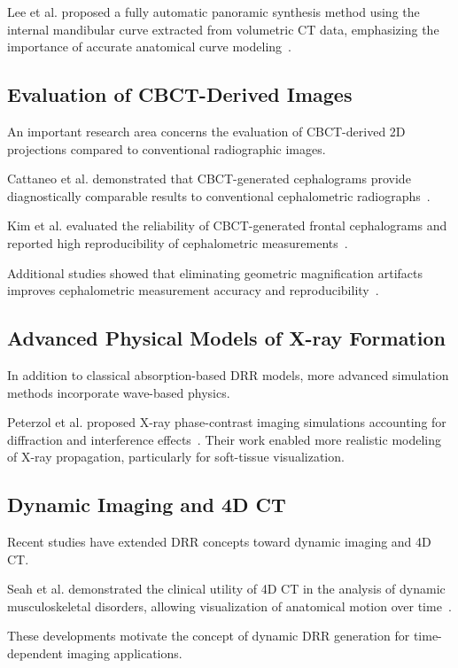 \documentclass[11pt,a4paper]{article}
\begin{document}
Lee et al. proposed a fully automatic panoramic synthesis method using the internal mandibular curve extracted from volumetric CT data, emphasizing the importance of accurate anatomical curve modeling~\cite{DBLP:conf/cimaging/LeeWLLS19}.

\subsection{Evaluation of CBCT-Derived Images}

An important research area concerns the evaluation of CBCT-derived 2D projections compared to conventional radiographic images.

Cattaneo et al. demonstrated that CBCT-generated cephalograms provide diagnostically comparable results to conventional cephalometric radiographs~\cite{Cattaneo2008}.

Kim et al. evaluated the reliability of CBCT-generated frontal cephalograms and reported high reproducibility of cephalometric measurements~\cite{Kim2012}.

Additional studies showed that eliminating geometric magnification artifacts improves cephalometric measurement accuracy and reproducibility~\cite{diagnostics11122292}.

\subsection{Advanced Physical Models of X-ray Formation}

In addition to classical absorption-based DRR models, more advanced simulation methods incorporate wave-based physics.

Peterzol et al. proposed X-ray phase-contrast imaging simulations accounting for diffraction and interference effects~\cite{Peterzol2007}. Their work enabled more realistic modeling of X-ray propagation, particularly for soft-tissue visualization.

\subsection{Dynamic Imaging and 4D CT}

Recent studies have extended DRR concepts toward dynamic imaging and 4D CT.

Seah et al. demonstrated the clinical utility of 4D CT in the analysis of dynamic musculoskeletal disorders, allowing visualization of anatomical motion over time~\cite{Seah2022}.

These developments motivate the concept of dynamic DRR generation for time-dependent imaging applications.
\end{document}
